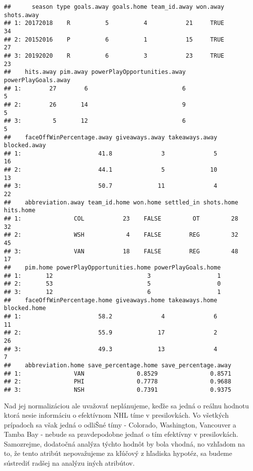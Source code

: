 \documentclass[
]{article}
\begin{document}
\begin{verbatim}
##      season type goals.away goals.home team_id.away won.away shots.away
## 1: 20172018    R          5          4           21     TRUE         34
## 2: 20152016    P          6          1           15     TRUE         27
## 3: 20192020    R          6          3           23     TRUE         23
##    hits.away pim.away powerPlayOpportunities.away powerPlayGoals.away
## 1:        27        6                           6                   5
## 2:        26       14                           9                   5
## 3:         5       12                           6                   5
##    faceOffWinPercentage.away giveaways.away takeaways.away blocked.away
## 1:                      41.8              3              5           16
## 2:                      44.1              5             10           13
## 3:                      50.7             11              4           22
##    abbreviation.away team_id.home won.home settled_in shots.home hits.home
## 1:               COL           23    FALSE         OT         28        32
## 2:               WSH            4    FALSE        REG         32        45
## 3:               VAN           18    FALSE        REG         48        17
##    pim.home powerPlayOpportunities.home powerPlayGoals.home
## 1:       12                           3                   1
## 2:       53                           5                   0
## 3:       12                           6                   1
##    faceOffWinPercentage.home giveaways.home takeaways.home blocked.home
## 1:                      58.2              4              6           11
## 2:                      55.9             17              2           26
## 3:                      49.3             13              4            7
##    abbreviation.home save_percentage.home save_percentage.away
## 1:               VAN               0.8529               0.8571
## 2:               PHI               0.7778               0.9688
## 3:               NSH               0.7391               0.9375
\end{verbatim}

Nad jej normalizáciou ale uvažovať neplánujeme, keďže sa jedná o reálnu
hodnotu ktorá nesie informáciu o efektívnom NHL tíme v presilovkách. Vo
všetkých prípadoch sa však jedná o odliŠné tímy - Colorado, Washington,
Vancouver a Tamba Bay - nebude sa pravdepodobne jednať o tím efektívny v
presilovkách. Samozrejme, dodatočná analýza týchto hodnôt by bola
vhodná, no vzhľadom na to, že tento atribút nepovažujeme za kľúčový z
hľadiska hypotéz, sa budeme sústrediť radšej na analýzu iných atribútov.
\end{document}
